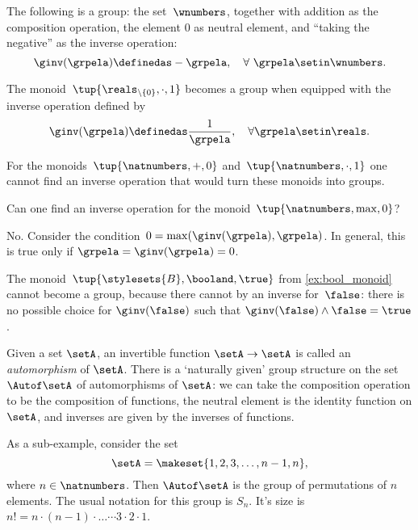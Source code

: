 \begin{example}
    The following is a group: the set~$\wnumbers$, together with addition as the composition operation, the element $0$ as neutral element, and ``taking the negative'' as the inverse operation:
    \begin{equation}
        \ginv(\grpela) \definedas -\grpela, \quad \forall \ \grpela \setin \wnumbers.
    \end{equation}
\end{example}
\begin{example}
    The monoid~$\tup{\reals_{\backslash \{ 0 \}}, \cdot, 1}$ becomes a group when equipped with the inverse operation defined by
    \begin{equation}
        \ginv(\grpela) \definedas \frac{1}{\grpela}, \quad \forall \grpela \setin \reals.
    \end{equation}
\end{example}

\begin{example}
    For the monoids~$\tup{\natnumbers, +,0}$ and~$\tup{\natnumbers,\cdot ,1}$ one cannot find an inverse operation that would turn these monoids into groups.
\end{example}

\begin{exercise}
    Can one find an inverse operation for the monoid~$\tup{\natnumbers,\max,0}$?
\end{exercise}
%
\begin{solution}
    No.
    Consider the condition~$0=\max(\ginv(\grpela),\grpela)$.
    In general, this is true only if $\grpela=\ginv(\grpela)=0$.
\end{solution}

\begin{example}
    The monoid~$\tup{\stylesets{B},\booland, \true}$ from \cref{ex:bool_monoid} cannot become a group, because there cannot by an inverse for~$\false$: there is no possible choice for $\ginv(\false)$ such that $\ginv(\false)\wedge \false=\true$.
\end{example}

\begin{example}
Given a set $\setA$, an invertible function $\setA \to \setA$ is called an \emph{automorphism} of $\setA$. There is a `naturally given' group structure on the set $\Autof\setA$ of automorphisms of $\setA$: we can take the composition operation to be the composition of functions, the neutral element is the identity function on $\setA$, and inverses are given by the inverses of functions.

As a sub-example, consider the set 
\begin{equation*}
\setA = \makeset{1, 2, 3, \dots, n-1, n},
\end{equation*}
where $n \in \natnumbers$. Then $\Autof\setA$ is the group of permutations of $n$ elements. The usual notation for this group is $S_n$. It's size is $n! = n \cdot (n-1) \cdot \dots \cdots 3 \cdot 2 \cdot 1$.

\end{example}


